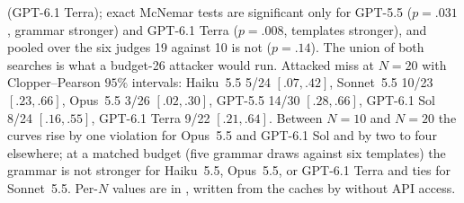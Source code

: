 (GPT-6.1 Terra); exact McNemar tests are significant only for GPT-5.5 ($p=.031$, grammar stronger) and
GPT-6.1 Terra ($p=.008$, templates stronger), and pooled over the six judges 19 against 10 is not
($p=.14$). The union of both searches is what a budget-26 attacker would run. Attacked miss at $N=20$ with Clopper--Pearson
$95\%$ intervals: Haiku~5.5 5/24 $[.07,.42]$, Sonnet~5.5 10/23 $[.23,.66]$, Opus~5.5 3/26 $[.02,.30]$,
GPT-5.5 14/30 $[.28,.66]$, GPT-6.1 Sol 8/24 $[.16,.55]$, GPT-6.1 Terra 9/22 $[.21,.64]$. Between $N=10$ and
$N=20$ the curves rise by one violation for Opus~5.5 and GPT-6.1 Sol and by two to four elsewhere; at a
matched budget (five grammar draws against six templates) the grammar is not stronger for Haiku~5.5,
Opus~5.5, or GPT-6.1 Terra and ties for Sonnet~5.5. Per-$N$ values are in , written
from the caches by  without API access.
